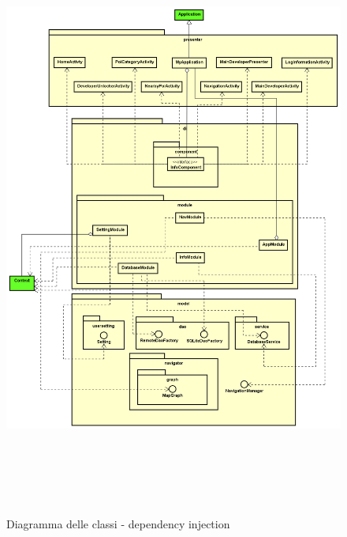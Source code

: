 \documentclass[../DefinizioneDiProdotto.tex,lanscape]{subfiles}
\begin{document}
\begin{figure}[H]
	\centering
	\includegraphics[height=19cm,width=\textwidth]{diagrams/ModelCompleteNoMethods/PNGpackage/di}
	\label{diPackage}
	\caption{Diagramma delle classi - dependency injection}
\end{figure}
\end{document}
